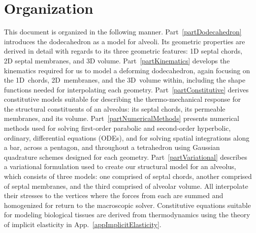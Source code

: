 \section{Organization}

This document is organized in the following manner.  Part~\ref{partDodecahedron} introduces the dodecahedron as a model for alveoli.  Its geometric properties are derived in detail with regards to its three geometric features: 1D septal chords, 2D septal membranes, and 3D volume.  Part~\ref{partKinematics} develops the kinematics required for us to model a deforming dodecahedron, again focusing on the 1D~chords, 2D~membranes, and the 3D~volume within, including the shape functions needed for interpolating each geometry.  Part~\ref{partConstitutive} derives constitutive models suitable for describing the thermo-mechanical response for the structural constituents of an alveolus: its septal chords, its permeable membranes, and its volume.  Part~\ref{partNumericalMethods} presents numerical methods used for solving first-order parabolic and second-order hyperbolic, ordinary, differential equations (ODEs), and for solving spatial integrations along a bar, across a pentagon, and throughout a tetrahedron using Gaussian quadrature schemes designed for each geometry.  Part~\ref{partVariational} describes a variational formulation used to create our structural model for an alveolus, which consists of three models: one comprised of septal chords, another comprised of septal membranes, and the third comprised of alveolar volume.  All interpolate their stresses to the vertices where the forces from each are summed and homogenized for return to the macroscopic solver.  Constitutive equations suitable for modeling biological tissues are derived from thermo\-dynamics using the theory of implicit elasticity in App.~\ref{appImplicitElasticity}.
